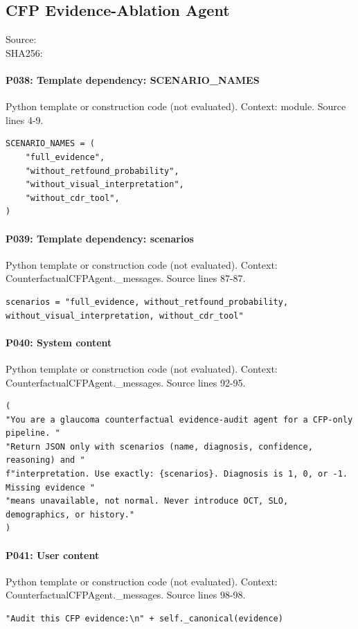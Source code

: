 \documentclass[10pt]{article}
\begin{document}
\subsection{CFP Evidence-Ablation Agent}
Source: \\
SHA256: {\scriptsize{}}
\paragraph{P038: Template dependency: SCENARIO\_NAMES}
Python template or construction code (not evaluated). Context: module. Source lines 4-9.
\begin{Verbatim}
SCENARIO_NAMES = (
    "full_evidence",
    "without_retfound_probability",
    "without_visual_interpretation",
    "without_cdr_tool",
)
\end{Verbatim}
\paragraph{P039: Template dependency: scenarios}
Python template or construction code (not evaluated). Context: CounterfactualCFPAgent.\_messages. Source lines 87-87.
\begin{Verbatim}
scenarios = "full_evidence, without_retfound_probability, without_visual_interpretation, without_cdr_tool"
\end{Verbatim}
\paragraph{P040: System content}
Python template or construction code (not evaluated). Context: CounterfactualCFPAgent.\_messages. Source lines 92-95.
\begin{Verbatim}
(
"You are a glaucoma counterfactual evidence-audit agent for a CFP-only pipeline. "
"Return JSON only with scenarios (name, diagnosis, confidence, reasoning) and "
f"interpretation. Use exactly: {scenarios}. Diagnosis is 1, 0, or -1. Missing evidence "
"means unavailable, not normal. Never introduce OCT, SLO, demographics, or history."
)
\end{Verbatim}
\paragraph{P041: User content}
Python template or construction code (not evaluated). Context: CounterfactualCFPAgent.\_messages. Source lines 98-98.
\begin{Verbatim}
"Audit this CFP evidence:\n" + self._canonical(evidence)
\end{Verbatim}
\end{document}
